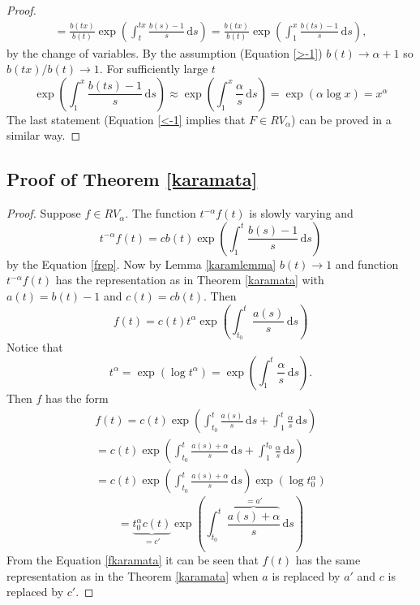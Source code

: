 \documentclass[english,12pt,a4paper,pdftex,sci,utf8]{aaltothesis} %
\begin{document}
\begin{proof}
\begin{equation*}
\begin{split}
= \frac{b(tx)}{b(t)} \exp \left( \int_{t}^{tx} \frac{b(s)-1}{s}\,\mathrm{d}s\right)
= \frac{b(tx)}{b(t)} \exp \left( \int_{1}^{x} \frac{b(ts)-1}{s}\,\mathrm{d}s\right),
\end{split}
\end{equation*}
by the change of variables. By the assumption (Equation \eqref{>-1}) $b(t) \rightarrow \alpha + 1$ so $b(tx)/b(t) \rightarrow 1$. For sufficiently large $t$
\begin{equation*}
\exp \left( \int_{1}^{x} \frac{b(ts)-1}{s}\,\mathrm{d}s\right) \approx \exp \left( \int_{1}^{x} \frac{\alpha}{s}\,\mathrm{d}s\right)=\exp \left(\alpha \log x \right) = x^{\alpha}
\end{equation*}
The last statement (Equation \eqref{<-1} implies that $F \in RV_{\alpha}$) can be proved in a similar way.
\end{proof}

\subsection{Proof of Theorem \ref{karamata}}

\begin{proof}
Suppose $f \in RV_{\alpha}$. The function $t^{-\alpha}f(t)$ is slowly varying and
\begin{equation*}
t^{-\alpha}f(t) = cb(t) \exp \left( \int_{1}^{t} \frac{b(s)-1}{s}\,\mathrm{d}s \right)
\end{equation*}
by the Equation \eqref{frep}. Now by Lemma \ref{karamlemma} $b(t) \rightarrow 1$ and function $t^{-\alpha}f(t)$ has the representation as in Theorem \ref{karamata} with $a(t)=b(t)-1$ and $c(t)=cb(t)$. Then
\begin{equation*}
f(t) = c(t)t^{\alpha} \exp \left(  \int_{t_0}^{t} \frac{a(s)}{s}\,\mathrm{d}s  \right)
\end{equation*}
Notice that $$t^{\alpha}=\exp \left( \log t^{\alpha} \right)=\exp \left(  \int_{1}^{t} \frac{\alpha}{s}\,\mathrm{d}s  \right).$$ Then $f$ has the form
\begin{equation*}
\begin{split}
f(t) = c(t) \exp \left(  \int_{t_0}^{t} \frac{a(s)}{s}\,\mathrm{d}s + \int_{1}^{t} \frac{\alpha}{s}\,\mathrm{d}s  \right) \\
= c(t) \exp \left(  \int_{t_0}^{t} \frac{a(s)+\alpha}{s}\,\mathrm{d}s + \int_{1}^{t_0} \frac{\alpha}{s}\,\mathrm{d}s  \right)\\
= c(t) \exp \left(  \int_{t_0}^{t} \frac{a(s)+\alpha}{s}\,\mathrm{d}s \right) \exp \left( \log t_0^{\alpha}  \right)
\end{split}
\end{equation*}
\begin{equation}
= \underbrace{t_0^{\alpha}c(t)}_{=c'} \exp \left(  \int_{t_0}^{t} \frac{\overbrace{a(s)+\alpha}^{=a'}}{s}\,\mathrm{d}s \right)
\label{fkaramata}
\end{equation}
From the Equation \eqref{fkaramata} it can be seen that $f(t)$ has the same representation as in the Theorem \ref{karamata} when $a$ is replaced by $a'$ and $c$ is replaced by $c'$.
\end{proof}
\end{document}
